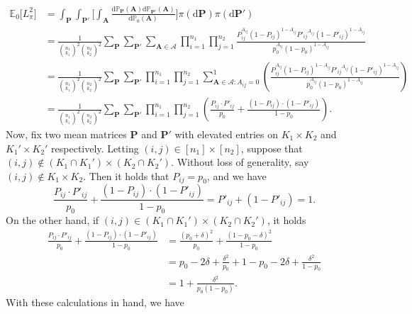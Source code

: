 \documentclass{article}
\newcommand{\D}{\textrm{d}}
\newcommand{\A}{\mathbf{A}}
\newcommand{\bbP}{\mathbb{P}}
\newcommand{\bP}{\mathbf{P}}
\newcommand{\cA}{\mathcal{A}}
\newcommand{\EE}{\mathbb{E}}
\begin{document}
\begin{align*}
    \EE_0\big[L_\pi^2\big] &= \int_\bP \int_{\bP'}\Big[\int_\A\frac{\D \bbP_\bP(\A)\D \bbP_{\bP'}(\A)}{\D \bbP_0(\A)}\Big]\pi(\D \bP)\pi(\D \bP')\\ 
    &= \frac{1}{{n_1 \choose k_1}^2 {n_2 \choose k_2}^2}\sum_{\bP}\sum_{\bP'}\sum_{\A \in \cA}\prod_{i=1}^{n_1}\prod_{j=1}^{n_2}\frac{P_{ij}^{A_{ij}} (1-P_{ij})^{1-A_{ij}}{P'_{ij}}^{A_{ij}} (1-P'_{ij})^{1-A_{ij}}}{p_0^{A_{ij}} (1-p_0)^{1-A_{ij}}} \\
    &= \frac{1}{{n_1 \choose k_1}^2 {n_2 \choose k_2}^2}\sum_{\bP}\sum_{\bP'}\prod_{i=1}^{n_1}\prod_{j=1}^{n_2}\sum_{\A \in \cA: A_{ij} = 0}^1\left(\frac{P_{ij}^{A_{ij}} (1-P_{ij})^{1-A_{ij}}{P'_{ij}}^{A_{ij}} (1-P'_{ij})^{1-A_{ij}}}{p_0^{A_{ij}} (1-p_0)^{1-A_{ij}}}\right) \\
    &= \frac{1}{{n_1 \choose k_1}^2 {n_2 \choose k_2}^2}\sum_{\bP}\sum_{\bP'}\prod_{i=1}^{n_1}\prod_{j=1}^{n_2}\left(\frac{P_{ij}\cdot P'_{ij}}{p_{0}}
    +    
    \frac{ (1-P_{ij}) \cdot (1-P'_{ij})}{1-p_{0}}\right).
\end{align*}
Now, fix two mean matrices $\bP$ and $\bP'$ with elevated entries on $K_1 \times K_2$ and $K_1' \times K_2'$ respectively. Letting $(i,j) \in [n_1] \times [n_2]$, suppose that $(i,j) \notin (K_1 \cap K_1') \times (K_2 \cap K_2')$. Without loss of generality, say $(i,j) \notin K_1 \times K_2$. Then it holds that $P_{ij} = p_0$, and we have
\[\frac{P_{ij}\cdot P'_{ij}}{p_{0}}
    +    
    \frac{ (1-P_{ij}) \cdot (1-P'_{ij})}{1-p_{0}} = P'_{ij} + (1-P'_{ij}) = 1.\]
On the other hand, if $(i,j) \in (K_1 \cap K_1') \times (K_2 \cap K_2')$, it holds
\begin{align*}
    \frac{P_{ij}\cdot P'_{ij}}{p_{0}}
    +    
    \frac{ (1-P_{ij}) \cdot (1-P'_{ij})}{1-p_{0}} &= \frac{(p_0 + \delta)^2}{p_{0}}
    +    
    \frac{ (1-p_0 - \delta)^2}{1-p_{0}}\\
    & = p_0 - 2 \delta + \frac{\delta^2}{p_0} + 1-p_0 - 2 \delta + \frac{\delta^2}{1-p_0}\\
    & = 1 + \frac{\delta^2}{p_0(1-p_0)}.
\end{align*}
With these calculations in hand, we have
\end{document}
